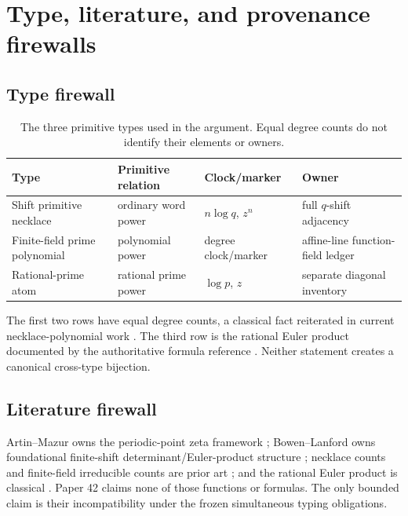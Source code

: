 \section{Type, literature, and provenance firewalls}
\label{app:boundaries}

\subsection{Type firewall}

\begin{table}[h]
\centering
\small
\caption{The three primitive types used in the argument. Equal degree counts
do not identify their elements or owners.}
\label{tab:type-firewall}
\begin{tabularx}{\textwidth}{@{}
  >{\raggedright\arraybackslash}p{}
  >{\raggedright\arraybackslash}p{}
  >{\raggedright\arraybackslash}p{}Y@{}}
\toprule
Type & Primitive relation & Clock/marker & Owner \\
\midrule
Shift primitive necklace & ordinary word power & $n\log q$, $z^n$ & full $q$-shift adjacency \\
Finite-field prime polynomial & polynomial power & degree clock/marker & affine-line function-field ledger \\
Rational-prime atom & rational prime power & $\log p$, $z$ & separate diagonal inventory \\
\bottomrule
\end{tabularx}
\end{table}

The first two rows have equal degree counts, a classical fact reiterated in
current necklace-polynomial work \citep{chebolu2026necklace}. The third row is
the rational Euler product documented by the authoritative formula reference
\citep{nistDLMF25211}. Neither statement creates a canonical cross-type
bijection.

\subsection{Literature firewall}

Artin--Mazur owns the periodic-point zeta framework
\citep{artin1965periodic}; Bowen--Lanford owns foundational finite-shift
determinant/Euler-product structure \citep{bowen1970zeta}; necklace counts and
finite-field irreducible counts are prior art
\citep{chebolu2026necklace}; and the rational Euler product is classical
\citep{nistDLMF25211}. Paper 42 claims none of those functions or formulas.
The only bounded claim is their incompatibility under the frozen simultaneous
typing obligations.

